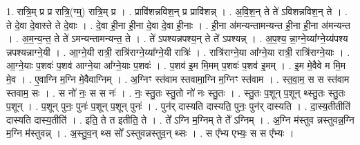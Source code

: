 \documentclass[17pt]{extarticle}
\begin{document}
1. रात्रि॒म् प्र प्र रात्रि॒(ग्म्॒) रात्रि॒म् प्र । . प्रावि॑शन्नविश॒न् प्र प्रावि॑शन्न् । . अ॒वि॒श॒न् ते ते॑ ऽविशन्नविश॒न् ते । . ते दे॒वा दे॒वास्ते ते दे॒वाः । . दे॒वा ही॒ना ही॒ना दे॒वा दे॒वा ही॒नाः । . ही॒ना अ॑मन्यन्तामन्यन्त ही॒ना ही॒ना अ॑मन्यन्त । . अ॒म॒न्य॒न्त॒ ते ते॑ ऽमन्यन्तामन्यन्त॒ ते । . ते॑ ऽपश्यन्नपश्य॒न् ते ते॑ ऽपश्यन्न् । . अ॒प॒श्य॒ न्ना॒ग्ने॒य्या᳚ग्ने॒य्य॑पश्य न्नपश्यन्नाग्ने॒यी । . आ॒ग्ने॒यी रात्री॒ रात्रि॑राग्ने॒य्या᳚ग्ने॒यी रात्रिः॑ । . रात्रि॑राग्ने॒या आ᳚ग्ने॒या रात्री॒ रात्रि॑राग्ने॒याः । . आ॒ग्ने॒याः प॒शवः॑ प॒शव॑ आग्ने॒या आ᳚ग्ने॒याः प॒शवः॑ । . प॒शव॑ इ॒म मि॒मम् प॒शवः॑ प॒शव॑ इ॒मम् । . इ॒म मे॒वैवे म मि॒म मे॒व । . ए॒वाग्नि म॒ग्नि मे॒वैवाग्निम् । . अ॒ग्निꣳ स्त॑वाम स्तवामा॒ग्नि म॒ग्निꣳ स्त॑वाम । . स्त॒वा॒म॒ स स स्त॑वाम स्तवाम॒ सः । . स नो॑ नः॒ स स नः॑ । . नः॒ स्तु॒तः स्तु॒तो नो॑ नः स्तु॒तः । . स्तु॒तः प॒शून् प॒शून् थ्स्तु॒तः स्तु॒तः प॒शून् । . प॒शून् पुनः॒ पुनः॑ प॒शून् प॒शून् पुनः॑ । . पुन॑र् दास्यति दास्यति॒ पुनः॒ पुन॑र् दास्यति । . दा॒स्य॒तीतीति॑ दास्यति दास्य॒तीति॑ । . इति॒ ते त इतीति॒ ते । . ते᳚ ऽग्नि म॒ग्निम् ते ते᳚ ऽग्निम् । . अ॒ग्नि म॑स्तुव न्नस्तुवन्न॒ग्नि म॒ग्नि म॑स्तुवन्न् । . अ॒स्तु॒व॒न् थ्स सो᳚ ऽस्तुवन्नस्तुव॒न् थ्सः । . स ए᳚भ्य एभ्यः॒ स स ए᳚भ्यः । \newline
\end{document}
